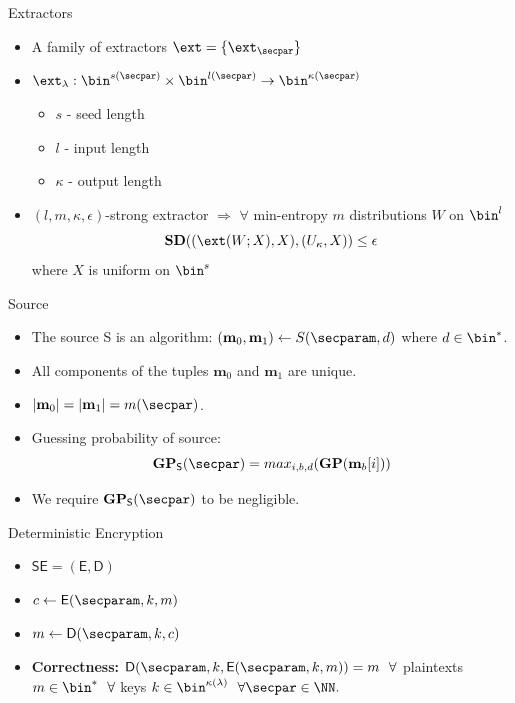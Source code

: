 \documentclass{beamer}
\newcommand{\smzero}{\textbf{m}_0}
\newcommand{\smone}{\textbf{m}_1}
\begin{document}
\begin{frame}{Extractors}
	\begin{itemize}
		\setlength\itemsep{1em}
		\item A family of extractors $\ext = \{\ext_{\secpar}\}$
		\item $\ext_{\lambda} : \bin^{s(\secpar)} \times \bin^{l(\secpar)} \rightarrow \bin^{\kappa(\secpar)}$
		\begin{itemize}
		    \item $s$ - seed length
		    \item $l$ - input length 
		    \item $\kappa$ - output length
		\end{itemize}
		\item $(l,m,\kappa,\epsilon)$-strong extractor $\Rightarrow$ $\forall$ min-entropy  $m$ distributions $W$ on $\bin^l$
		    \begin{equation*}
		        \textbf{SD}((\ext(W; X), X), (U_\kappa,X )) \leq \epsilon
		    \end{equation*}
		 where $X$ is uniform on $\bin^s$
	\end{itemize}
\end{frame}

\begin{frame}{Source}
	\begin{itemize}
		\setlength\itemsep{1em}
		\item The source S is an algorithm: $(\smzero, \smone) \leftarrow S(\secparam, d)$ where $d \in \bin^*$.
		\item All components of the tuples $\smzero$ and $\smone$ are unique.
		\item $|\smzero| = |\smone|= m(\secpar)$.
		\item Guessing probability of source:
		    \begin{equation*}
                \textbf{GP}_\mathsf{S}(\secpar) = max_{i,b,d}(\textbf{GP}(\textbf{m}_b[i]))
            \end{equation*}
        \item We require $\textbf{GP}_\mathsf{S}(\secpar)$ to be negligible.
	\end{itemize}
\end{frame}

\begin{frame}{Deterministic Encryption}
	\begin{itemize}
		\setlength\itemsep{1em}
		\item $\mathsf{SE=(E, D)}$
		\item $c \leftarrow \mathsf{E}(\secparam, k, m)$
		\item $m \leftarrow \mathsf{D}(\secparam, k, c)$
		\item \textbf{Correctness:}  $\mathsf{D}(\secparam , k, \mathsf{E}(\secparam , k, m)) = m\ \  \forall$  plaintexts $m \in \bin^*\ \  \forall$  keys $k \in \bin^{\kappa(\lambda)}\ \   \forall \secpar \in \NN.$
	\end{itemize}
\end{frame}
\end{document}
